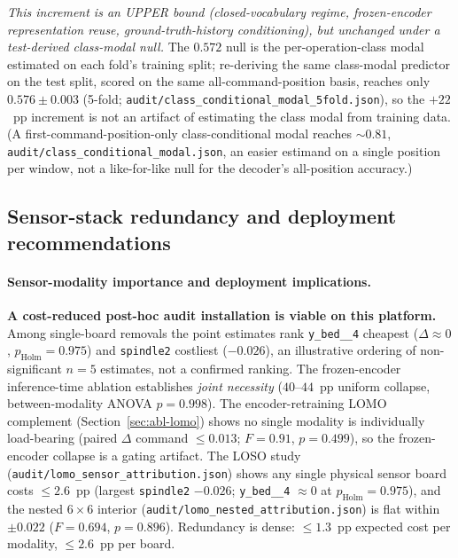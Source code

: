 \documentclass[sensors,article,submit,moreauthors,pdftex]{Definitions/mdpi}
\begin{document}
\emph{This increment is an UPPER bound (closed-vocabulary regime, frozen-encoder representation reuse, ground-truth-history conditioning), but unchanged under a test-derived class-modal null.} The $0.572$ null is the per-operation-class modal estimated on each fold's training split; re-deriving the same class-modal predictor on the test split, scored on the same all-command-position basis, reaches only $0.576 \pm 0.003$ (5-fold; \texttt{audit/class\_conditional\_modal\_5fold.json}), so the $+22$~pp increment is not an artifact of estimating the class modal from training data. (A first-command-position-only class-conditional modal reaches $\sim\!0.81$, \texttt{audit/class\_conditional\_modal.json}, an easier estimand on a single position per window, not a like-for-like null for the decoder's all-position accuracy.)

\subsection{Sensor-stack redundancy and deployment recommendations}
\label{sec:disc-deployment-stack}

\paragraph{Sensor-modality importance and deployment implications.}\label{sec:disc-modality}\hspace*{0pt plus 1fill}

\textbf{A cost-reduced post-hoc audit installation is viable on this platform.} Among single-board removals the point estimates rank \texttt{y\_bed\_\_4} cheapest ($\Delta\!\approx\!0$, $p_{\text{Holm}}\!=\!0.975$) and \texttt{spindle2} costliest ($-0.026$), an illustrative ordering of non-significant $n\!=\!5$ estimates, not a confirmed ranking. The frozen-encoder inference-time ablation establishes \emph{joint necessity} ($40$--$44$~pp uniform collapse, between-modality ANOVA $p\!=\!0.998$). The encoder-retraining LOMO complement (Section~\ref{sec:abl-lomo}) shows no single modality is individually load-bearing (paired $\Delta$ command $\le\!0.013$; $F\!=\!0.91$, $p\!=\!0.499$), so the frozen-encoder collapse is a gating artifact. The LOSO study (\texttt{audit/lomo\_sensor\_attribution.json}) shows any single physical sensor board costs $\le\!2.6$~pp (largest \texttt{spindle2} $-0.026$; \texttt{y\_bed\_\_4} $\approx\!0$ at $p_{\text{Holm}}\!=\!0.975$), and the nested $6\!\times\!6$ interior (\texttt{audit/lomo\_nested\_attribution.json}) is flat within $\pm0.022$ ($F\!=\!0.694$, $p\!=\!0.896$). Redundancy is dense: $\le\!1.3$~pp expected cost per modality, $\le\!2.6$~pp per board.
\end{document}
